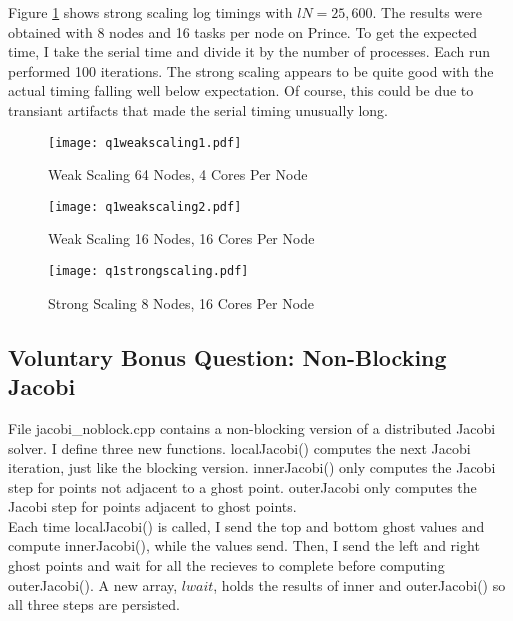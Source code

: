 \documentclass[10pt]{article}
\begin{document}
Figure \ref{fig2a} shows strong scaling log timings with $lN = 25,600$. The results were obtained with 8 nodes and 16 tasks per node on Prince. To get the expected time, I take the serial time and divide it by the number of processes. Each run performed 100 iterations. The strong scaling appears to be quite good with the actual timing falling well below expectation. Of course, this could be due to transiant artifacts that made the serial timing unusually long.

\lipsum

\begin{figure}[!h]
    \centering
    \begin{minipage}{0.45\textwidth}
        \centering
        \texttt{[image: q1weakscaling1.pdf]} %
        \caption{Weak Scaling 64 Nodes, 4 Cores Per Node}
        \label{fig1}
    \end{minipage}\hfill
         \begin{minipage}{0.45\textwidth}
        \centering
        \texttt{[image: q1weakscaling2.pdf]} %
        \caption{Weak Scaling 16 Nodes, 16 Cores Per Node}
        \label{fig2}
    \end{minipage}
     \begin{minipage}{0.45\textwidth}
        \centering
        \texttt{[image: q1strongscaling.pdf]} %
        \caption{Strong Scaling 8 Nodes, 16 Cores Per Node}
        \label{fig2a}
    \end{minipage}
\end{figure}

\lipsum

\subsection{Voluntary Bonus Question: Non-Blocking Jacobi}

File jacobi\_noblock.cpp contains a non-blocking version of a distributed Jacobi solver. I define three new functions. localJacobi() computes the next Jacobi iteration, just like the blocking version. innerJacobi() only computes the Jacobi step for points not adjacent to a ghost point. outerJacobi only computes the Jacobi step for points adjacent to ghost points.\\

Each time localJacobi() is called, I send the top and bottom ghost values and compute innerJacobi(), while the values send. Then, I send the left and right ghost points and wait for all the recieves to complete before computing outerJacobi(). A new array, $lwait$, holds the results of inner and outerJacobi() so all three steps are persisted.\\
\end{document}
